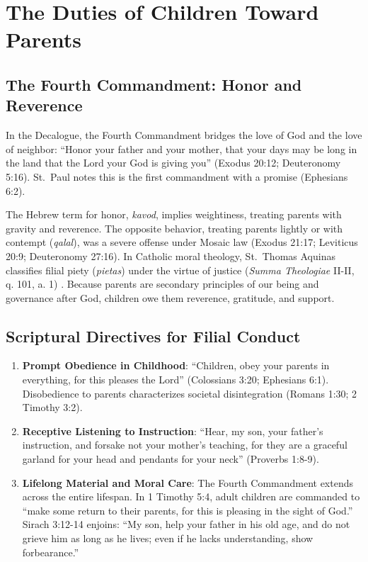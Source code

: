 \documentclass[11pt,twocolumn]{article}
\begin{document}
\section{The Duties of Children Toward Parents}

\subsection{The Fourth Commandment: Honor and Reverence}
In the Decalogue, the Fourth Commandment bridges the love of God and the love of neighbor: ``Honor your father and your mother, that your days may be long in the land that the Lord your God is giving you'' (Exodus 20:12; Deuteronomy 5:16). St.~Paul notes this is the first commandment with a promise (Ephesians 6:2).

The Hebrew term for honor, \textit{kavod}, implies weightiness, treating parents with gravity and reverence. The opposite behavior, treating parents lightly or with contempt (\textit{qalal}), was a severe offense under Mosaic law (Exodus 21:17; Leviticus 20:9; Deuteronomy 27:16). In Catholic moral theology, St.~Thomas Aquinas classifies filial piety (\textit{pietas}) under the virtue of justice (\textit{Summa Theologiae} II-II, q. 101, a. 1) \cite{aquinas_summa}. Because parents are secondary principles of our being and governance after God, children owe them reverence, gratitude, and support.

\subsection{Scriptural Directives for Filial Conduct}
\begin{enumerate}
    \item \textbf{Prompt Obedience in Childhood}: ``Children, obey your parents in everything, for this pleases the Lord'' (Colossians 3:20; Ephesians 6:1). Disobedience to parents characterizes societal disintegration (Romans 1:30; 2 Timothy 3:2).
    \item \textbf{Receptive Listening to Instruction}: ``Hear, my son, your father's instruction, and forsake not your mother's teaching, for they are a graceful garland for your head and pendants for your neck'' (Proverbs 1:8-9).
    \item \textbf{Lifelong Material and Moral Care}: The Fourth Commandment extends across the entire lifespan. In 1 Timothy 5:4, adult children are commanded to ``make some return to their parents, for this is pleasing in the sight of God.'' Sirach 3:12-14 enjoins: ``My son, help your father in his old age, and do not grieve him as long as he lives; even if he lacks understanding, show forbearance.''
\end{enumerate}
\end{document}
